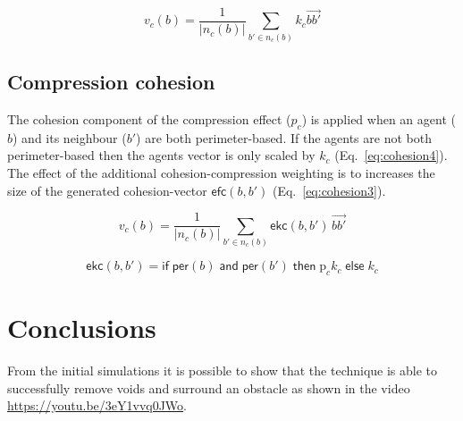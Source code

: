 \documentclass[12pt,a4paper]{article}
\begin{document}
\begin{equation}\label{eq:cohesion2}
v_c(b) = \frac{1}{\lvert n_c(b)\rvert} \sum_{b' \in n_c(b)}k_c\vec{b b'}
\end{equation}

\subsection{Compression cohesion}
The cohesion component of the compression effect ($p_c$) is applied when an agent ($b$) and its neighbour ($b'$) are both perimeter-based. If the agents are not both perimeter-based then the agents vector is only scaled by $k_c$ (Eq.~\ref{eq:cohesion4}). The effect of the additional cohesion-compression weighting is to increases the size of the generated cohesion-vector $\mathsf{efc}(b,b')$ (Eq.~\ref{eq:cohesion3}). 

\begin{equation}\label{eq:cohesion3}
v_c(b) = \frac{1}{\lvert n_c(b)\rvert} \sum_{b' \in n_c(b)}\mathsf{ekc}(b, b')\, \vec{b b'}
\end{equation}

\begin{equation}\label{eq:cohesion4}
\mathsf{ekc}(b, b') = \mathsf{if} \; \mathsf{per}(b) \; \mathsf{and} \; \mathsf{per}(b') \; \mathsf{then} \; \mathrm{p}_ck_c \; \mathsf{else} \; k_c
\end{equation}

\section{Conclusions}\label{conclusions}
From the initial simulations it is possible to show that the technique is able to successfully remove voids and surround an obstacle as shown in the video \href{https://youtu.be/3eY1vvq0JWo}{https://youtu.be/3eY1vvq0JWo}.



\end{document}
